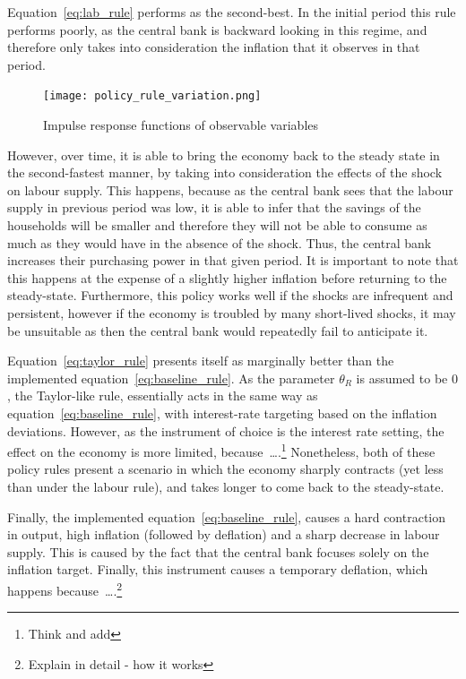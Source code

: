 \documentclass[12pt]{article}
\begin{document}
Equation~\ref{eq:lab_rule} performs as the second-best. In the initial period this rule performs poorly, as the central bank is backward looking in this regime, and therefore only takes into consideration the inflation that it observes in that period.  

\begin{figure}[!h]
    \caption{Impulse response functions of observable variables}\label{fig:policy_rule_variation}
    \centering
    \texttt{[image: policy\_rule\_variation.png]}
\end{figure}

However, over time, it is able to bring the economy back to the steady state in the second-fastest manner, by taking into consideration the effects of the shock on labour supply. This happens, because as the central bank sees that the labour supply in previous period was low, it is able to infer that the savings of the households will be smaller and therefore they will not be able to consume as much as they would have in the absence of the shock. Thus, the central bank increases their purchasing power in that given period. It is important to note that this happens at the expense of a slightly higher inflation before returning to the steady-state. Furthermore, this policy works well if the shocks are infrequent and persistent, however if the economy is troubled by many short-lived shocks, it may be unsuitable as then the central bank would repeatedly fail to anticipate it.

Equation~\ref{eq:taylor_rule} presents itself as marginally better than the implemented equation~\ref{eq:baseline_rule}. As the parameter $\theta_R$ is assumed to be $0$, the Taylor-like rule, essentially acts in the same way as equation~\ref{eq:baseline_rule}, with interest-rate targeting based on the inflation deviations. However, as the instrument of choice is the interest rate setting, the effect on the economy is more limited, because\ \dots.\footnote{Think and add} Nonetheless, both of these policy rules present a scenario in which the economy sharply contracts (yet less than under the labour rule), and takes longer to come back to the steady-state. 

Finally, the implemented equation~\ref{eq:baseline_rule}, causes a hard contraction in output, high inflation (followed by deflation) and a sharp decrease in labour supply. This is caused by the fact that the central bank focuses solely on the inflation target. Finally, this instrument causes a temporary deflation, which happens because\ \dots.\footnote{Explain in detail - how it works}
\end{document}
